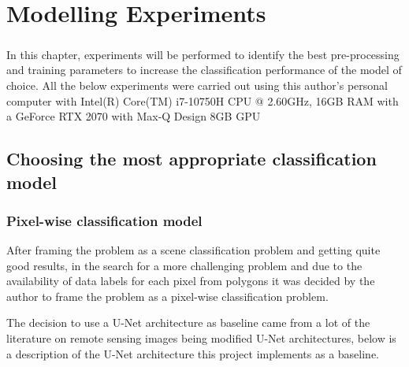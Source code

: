 \chapter{ Modelling Experiments} \label{experiments_chapter}
\paragraph{}
In this chapter, experiments will be performed to identify the best pre-processing and training parameters to increase the classification performance of the model of choice. 
All the below experiments were carried out using this author's personal computer with Intel(R) Core(TM) i7-10750H \gls{CPU} @ 2.60GHz, 16GB \gls{RAM} with a GeForce RTX 2070 with Max-Q Design 8GB \gls{GPU}
\section{Choosing the most appropriate classification model} \label{classification_models}
\subsection{Pixel-wise classification model} \label{pixel_model}
After framing the problem as a scene classification problem and getting quite good results, in the search for a more challenging problem and due to the availability of data labels for each pixel from polygons it was decided by the author to frame the problem as a pixel-wise classification problem.

The decision to use a U-Net architecture as baseline came from a lot of the literature on remote sensing images being modified U-Net architectures, below is a description of the U-Net architecture this project implements as a baseline.
